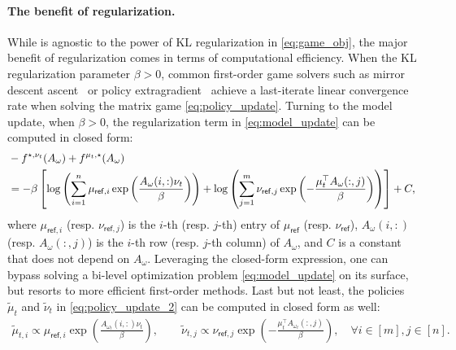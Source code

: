 \paragraph{The benefit of regularization.} While \name is agnostic to the power of KL regularization in \eqref{eq:game_obj}, the major benefit of regularization comes in terms of computational efficiency. When the KL regularization parameter $\beta>0$, common first-order game solvers such as mirror descent ascent~\citep{sokota2022unified} or policy extragradient~\citep{cen2021fast} achieve a last-iterate  linear convergence rate when solving the matrix game \eqref{eq:policy_update}. Turning to the model update, when $\beta>0$, the regularization term in \eqref{eq:model_update} can be computed in closed form:
\begin{align}\label{eq:regularization_closed_form}
    & -  f^{\star,\nu_t}(A_\omega)+   f^{\mu_t,\star}(A_\omega) \notag\\
    &= - \beta\left[\log\left(\sum_{i=1}^n \mu_{\mathsf{ref},i} \exp\left(\frac{A_{\omega}(i,:)\nu_t}{\beta}\right)\right) +\log\left(\sum_{j=1}^m \nu_{\mathsf{ref},j} \exp\left(-\frac{\mu_t^\top A_{\omega}(:,j)}{\beta}\right)\right)\right]+C,
\end{align}
where $\mu_{\mathsf{ref},i}$ (resp. $\nu_{\mathsf{ref},j}$) is the $i$-th (resp. $j$-th) entry of $\mu_{\mathsf{ref}}$ (resp. $\nu_{\mathsf{ref}}$), $A_{\omega}(i,:)$ (resp. $A_{\omega}(:,j)$) is the $i$-th row (resp. $j$-th column) of $A_{\omega}$, and $C$ is a constant that does not depend on $A_\omega$. Leveraging the closed-form expression, one can bypass solving a bi-level optimization problem \eqref{eq:model_update} on its surface, but resorts to more efficient first-order methods. Last but not least, the policies $\widetilde{\mu}_t$ and $\widetilde{\nu}_t$ in \eqref{eq:policy_update_2} can be computed in closed form as well:
\begin{align}\label{eq:tilde_pi_closed_form}
    \widetilde{\mu}_{t,i} \propto \mu_{\mathsf{ref},i} \exp\left(\frac{A_{\omega_t}(i,:)\nu_t}{\beta}\right) ,\qquad \widetilde{\nu}_{t,j} \propto  \nu_{\mathsf{ref},j} \exp\left(-\frac{\mu_t^\top A_{\omega_t}(:,j)}{\beta}\right) ,\quad \forall i\in[m], j\in[n].
\end{align}


